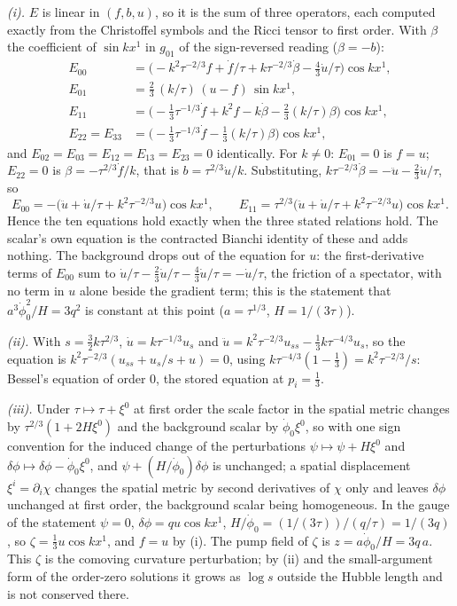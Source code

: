 \emph{(i).} $E$ is linear in $(f, b, u)$, so it is the sum of three operators, each computed exactly from the Christoffel symbols and the Ricci tensor to first order. With $\beta$ the coefficient of $\sin kx^{1}$ in $g_{01}$ of the sign-reversed reading ($\beta = -b$):
\begin{align*}
E_{00} &= \bigl(-k^{2}\tau^{-2/3}f + \dot f/\tau + k\tau^{-2/3}\dot\beta - \tfrac43\dot u/\tau\bigr)\cos kx^{1},\\
E_{01} &= \tfrac23\,(k/\tau)\,(u - f)\,\sin kx^{1},\\
E_{11} &= \bigl(-\tfrac13\tau^{-1/3}\dot f + k^{2}f - k\dot\beta - \tfrac23(k/\tau)\beta\bigr)\cos kx^{1},\\
E_{22} = E_{33} &= \bigl(-\tfrac13\tau^{-1/3}\dot f - \tfrac13(k/\tau)\beta\bigr)\cos kx^{1},
\end{align*}
and $E_{02} = E_{03} = E_{12} = E_{13} = E_{23} = 0$ identically. For $k \neq 0$: $E_{01} = 0$ is $f = u$; $E_{22} = 0$ is $\beta = -\tau^{2/3}\dot f/k$, that is $b = \tau^{2/3}\dot u/k$. Substituting, $k\tau^{-2/3}\dot\beta = -\ddot u - \tfrac23\dot u/\tau$, so
\[
E_{00} = -\bigl(\ddot u + \dot u/\tau + k^{2}\tau^{-2/3}u\bigr)\cos kx^{1}, \qquad E_{11} = \tau^{2/3}\bigl(\ddot u + \dot u/\tau + k^{2}\tau^{-2/3}u\bigr)\cos kx^{1} .
\]
Hence the ten equations hold exactly when the three stated relations hold. The scalar's own equation is the contracted Bianchi identity of these and adds nothing. The background drops out of the equation for $u$: the first-derivative terms of $E_{00}$ sum to $\dot u/\tau - \tfrac23\dot u/\tau - \tfrac43\dot u/\tau = -\dot u/\tau$, the friction of a spectator, with no term in $u$ alone beside the gradient term; this is the statement that $a^{3}\dot\phi_{0}^{2}/H = 3q^{2}$ is constant at this point ($a = \tau^{1/3}$, $H = 1/(3\tau)$).

\emph{(ii).} With $s = \tfrac32k\tau^{2/3}$, $\dot u = k\tau^{-1/3}u_{s}$ and $\ddot u = k^{2}\tau^{-2/3}u_{ss} - \tfrac13k\tau^{-4/3}u_{s}$, so the equation is $k^{2}\tau^{-2/3}(u_{ss} + u_{s}/s + u) = 0$, using $k\tau^{-4/3}(1 - \tfrac13) = k^{2}\tau^{-2/3}/s$: Bessel's equation of order $0$, the stored equation at $p_{i} = \tfrac13$.

\emph{(iii).} Under $\tau \mapsto \tau + \xi^{0}$ at first order the scale factor in the spatial metric changes by $\tau^{2/3}(1 + 2H\xi^{0})$ and the background scalar by $\dot\phi_{0}\xi^{0}$, so with one sign convention for the induced change of the perturbations $\psi \mapsto \psi + H\xi^{0}$ and $\delta\phi \mapsto \delta\phi - \dot\phi_{0}\xi^{0}$, and $\psi + (H/\dot\phi_{0})\delta\phi$ is unchanged; a spatial displacement $\xi^{i} = \partial_{i}\chi$ changes the spatial metric by second derivatives of $\chi$ only and leaves $\delta\phi$ unchanged at first order, the background scalar being homogeneous. In the gauge of the statement $\psi = 0$, $\delta\phi = qu\cos kx^{1}$, $H/\dot\phi_{0} = (1/(3\tau))/(q/\tau) = 1/(3q)$, so $\zeta = \tfrac13u\cos kx^{1}$, and $f = u$ by (i). The pump field of $\zeta$ is $z = a\dot\phi_{0}/H = 3q\,a$. This $\zeta$ is the comoving curvature perturbation; by (ii) and the small-argument form of the order-zero solutions it grows as $\log s$ outside the Hubble length and is not conserved there.

